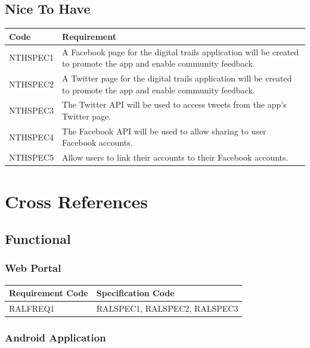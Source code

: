 \documentclass[11pt,a4paper]{article}
\begin{document}
\subsection{Nice To Have}

\begin{longtable}{|p{2.5cm}p{13cm}|}
\hline
\textbf{Code} & \textbf{Requirement} \\

\hline
NTHSPEC1 & A Facebook page for the digital trails application will be created to promote the app and enable community feedback. \\ \hline
NTHSPEC2 &  A Twitter page for the digital trails application will be created to promote the app and enable community feedback. \\ \hline
NTHSPEC3 & The Twitter API will be used to access tweets from the app's Twitter page. \\ \hline
NTHSPEC4 & The Facebook API will be used to allow sharing to user Facebook accounts. \\ \hline
NTHSPEC5 & Allow users to link their accounts to their Facebook accounts. \\ \hline
\end{longtable}


\section{Cross References}
\label{sec:cross-refs}

\subsection{Functional}

\subsubsection{Web Portal}

\begin{longtable}{|p{2.7cm}|p{10cm}|}
\hline
\textbf{Requirement Code} & \textbf{Specification Code} \\

\hline \hline RALFREQ1 & RALSPEC1, RALSPEC2, RALSPEC3  \\
\hline 
\end{longtable}


\subsubsection{Android Application}
\end{document}
